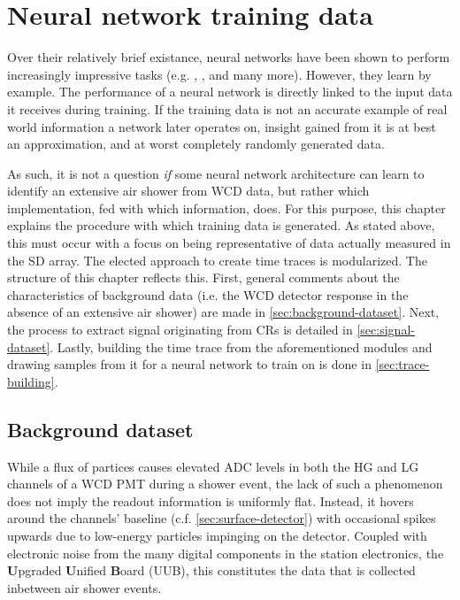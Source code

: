
\chapter{Neural network training data}
\label{chap:neural-network-data}

Over their relatively brief existance, neural networks have been shown to perform increasingly impressive tasks (e.g.  \cite{openai2019dota}, \cite{openai2023gpt4}, 
and many more). However, they learn by example. The performance of a neural network is directly linked to the input data it receives during training. If the 
training data is not an accurate example of real world information a network later operates on, insight gained from it is at best an approximation, and at worst
completely randomly generated data. 

As such, it is not a question \textit{if} some neural network architecture can learn to identify an extensive air shower from WCD data, but rather which 
implementation, fed with which information, does. For this purpose, this chapter explains the procedure with which training data is generated. As stated above, this
must occur with a focus on being representative of data actually measured in the SD array. The elected approach to create time traces is modularized. The structure
of this chapter reflects this. First, general comments about the characteristics of background data (i.e. the WCD detector response in the absence of an extensive 
air shower) are made in \autoref{sec:background-dataset}. Next, the process to extract signal originating from CRs is detailed in \autoref{sec:signal-dataset}.
Lastly, building the time trace from the aforementioned modules and drawing samples from it for a neural network to train on is done in \autoref{sec:trace-building}.

\section{Background dataset}
\label{sec:background-dataset}

While a flux of partices causes elevated ADC levels in both the HG and LG channels of a WCD PMT during a shower event, the lack of such a phenomenon does not imply 
the readout information is uniformly flat. Instead, it hovers around the channels' baseline (c.f. \autoref{sec:surface-detector}) with occasional spikes upwards 
due to low-energy particles impinging on the detector. Coupled with electronic noise from the many digital components in the station electronics, the 
\textbf{U}pgraded \textbf{U}nified \textbf{B}oard (UUB), this constitutes the data that is collected inbetween air shower events.

